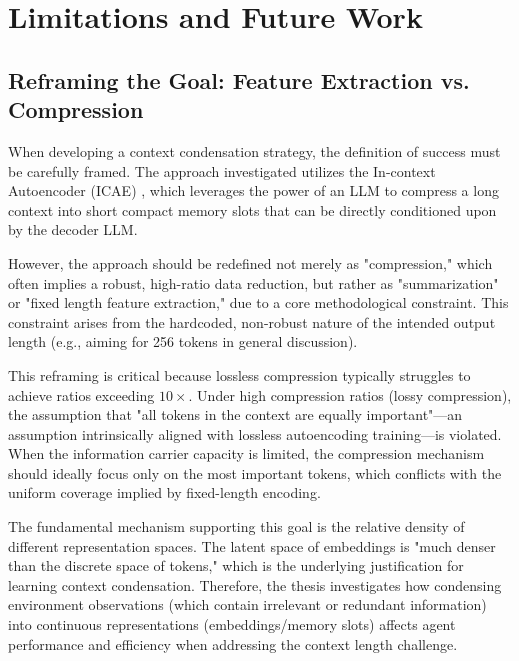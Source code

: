 \chapter{Limitations and Future Work}

\section{Reframing the Goal: Feature Extraction vs. Compression}

When developing a context condensation strategy, the definition of success must be carefully framed.
The approach investigated utilizes the In-context Autoencoder (ICAE) \cite{ge_-context_2024}, which leverages the power of an LLM to compress a long context into short compact memory slots that can be directly conditioned upon by the decoder LLM.

However, the approach should be redefined not merely as "compression," which often implies a robust, high-ratio data reduction, but rather as "summarization" or "fixed length feature extraction," due to a core methodological constraint.
This constraint arises from the hardcoded, non-robust nature of the intended output length (e.g., aiming for 256 tokens in general discussion).

This reframing is critical because lossless compression typically struggles to achieve ratios exceeding $10\times$.
Under high compression ratios (lossy compression), the assumption that "all tokens in the context are equally important"—an assumption intrinsically aligned with lossless autoencoding training—is violated.
When the information carrier capacity is limited, the compression mechanism should ideally focus only on the most important tokens, which conflicts with the uniform coverage implied by fixed-length encoding.

The fundamental mechanism supporting this goal is the relative density of different representation spaces.
The latent space of embeddings is "much denser than the discrete space of tokens," which is the underlying justification for learning context condensation.
Therefore, the thesis investigates how condensing environment observations (which contain irrelevant or redundant information) into continuous representations (embeddings/memory slots) affects agent performance and efficiency when addressing the context length challenge.


